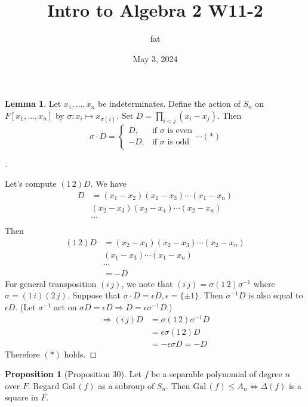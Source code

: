 \documentclass{article}
\title{Intro to Algebra 2 W11-2}
\author{fat}
\date{May 3, 2024}
\theoremstyle{definition}
\newtheorem{lem}{Lemma}
\newtheorem{prop}{Proposition}
\newenvironment{proofs}[1][\proofname]{%
  \begin{proof}[#1]$ $\par\nobreak\ignorespaces
}{%
  \end{proof}
}
\newcommand{\Ra}{\Rightarrow}
\newcommand{\Lra}{\Leftrightarrow}
\newcommand{\Gal}{\text{Gal}\,}
\begin{document}
\maketitle
\thispagestyle{fancy}
\renewcommand{\footrulewidth}{0.4pt}
\cfoot{\thepage}
\renewcommand{\headrulewidth}{0.4pt}

\begin{lem}
	Let $x_1, ..., x_n$ be indeterminates.
	Define the action of $S_n$ on $F[x_1, ..., x_n]$ by $\sigma: x_i \mapsto x_{\sigma(i)}$.
	Set $D = \prod_{i < j} (x_i - x_j)$.
	Then
	\[
		\sigma \cdot D = 
		\begin{cases}
			D, &\text{if } \sigma \text{ is even}\\
			-D, &\text{if } \sigma \text{ is odd}
		\end{cases}
		\cdots (*)
	\]
\end{lem}

\begin{proofs}
	Let's compute $(1 \, 2) D$.
	We have
	\[
		\begin{split}
			D &= (x_1 - x_2) (x_1 - x_3) \cdots (x_1 - x_n)\\
			&(x_2 - x_3) (x_2 - x_4) \cdots (x_2 - x_n)\\
			&\cdots \\
		\end{split}
	\]
	Then 
	\[
		\begin{split}
			(1 \, 2) D &= (x_2 - x_1) (x_2 - x_3) \cdots (x_2 - x_n)\\
			&(x_1 - x_3) \cdots (x_1 - x_n)\\
			&\cdots \\
			&= -D
		\end{split}
	\]
	For general transposition $(i \, j)$, we note that $(i \, j) = \sigma (1 \, 2) \sigma^{-1}$ where $\sigma = (1 \, i) (2 \, j)$.
	Suppose that $\sigma \cdot D = \epsilon D, \epsilon = \{\pm 1\}$.
	Then $\sigma^{-1} D$ is also equal to $\epsilon D$.
	(Let $\sigma^{-1}$ act on $\sigma D = \epsilon D \Ra D = \epsilon \sigma^{-1} D$.)
	\[
		\begin{split}
			\Ra (i \, j) D &= \sigma (1 \, 2) \sigma^{-1} D\\
			&= \epsilon \sigma (1 \, 2) D\\
			&= - \epsilon \sigma D = -D
		\end{split}
	\]
	Therefore $(*)$ holds.
\end{proofs}

\begin{prop}[Proposition 30]
	Let $f$ be a separable polynomial of degree $n$ over $F$.
	Regard $\Gal(f)$ as a subroup of $S_n$.
	Then $\Gal(f) \leq A_n \Lra \Delta(f)$ is a square in $F$.
\end{prop}
\end{document}
